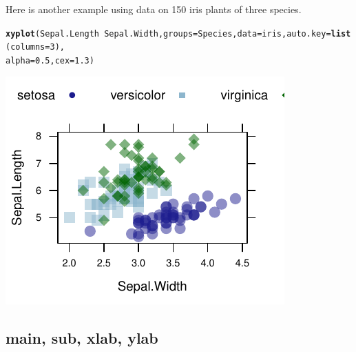 \documentclass[twoside]{book}\usepackage[]{graphicx}\usepackage[]{xcolor}
\makeatletter
\def\maxwidth{ %
  \ifdim\Gin@nat@width>\linewidth
    \linewidth
  \else
    \Gin@nat@width
  \fi
}
\newcommand{\hlnum}[1]{\textcolor[rgb]{0.686,0.059,0.569}{#1}}%
\newcommand{\hlopt}[1]{\textcolor[rgb]{0,0,0}{#1}}%
\newcommand{\hlstd}[1]{\textcolor[rgb]{0.345,0.345,0.345}{#1}}%
\newcommand{\hlkwc}[1]{\textcolor[rgb]{0.333,0.667,0.333}{#1}}%
\newcommand{\hlkwd}[1]{\textcolor[rgb]{0.737,0.353,0.396}{\textbf{#1}}}%
\newenvironment{kframe}{%
 \def\at@end@of@kframe{}%
 \ifinner\ifhmode%
  \def\at@end@of@kframe{\end{minipage}}%
  \begin{minipage}{\columnwidth}%
 \fi\fi%
 \def\FrameCommand##1{\hskip\@totalleftmargin \hskip-\fboxsep
 \colorbox{shadecolor}{##1}\hskip-\fboxsep
     \hskip-\linewidth \hskip-\@totalleftmargin \hskip\columnwidth}%
 \MakeFramed {\advance\hsize-\width
   \@totalleftmargin\z@ \linewidth\hsize
   \@setminipage}}%
 {\par\unskip\endMakeFramed%
 \at@end@of@kframe}
\newenvironment{knitrout}{}{} %
\newcounter{example}[section]
\makeatother
\begin{document}
Here is another example using data on 150 iris plants of three species.
\begin{knitrout}
\color{fgcolor}\begin{kframe}
\begin{alltt}
\hlkwd{xyplot}\hlstd{(Sepal.Length} \hlopt{~} \hlstd{Sepal.Width,} \hlkwc{groups} \hlstd{= Species,} \hlkwc{data} \hlstd{= iris,} \hlkwc{auto.key} \hlstd{=} \hlkwd{list}\hlstd{(}\hlkwc{columns} \hlstd{=} \hlnum{3}\hlstd{),}
    \hlkwc{alpha} \hlstd{=} \hlnum{0.5}\hlstd{,} \hlkwc{cex} \hlstd{=} \hlnum{1.3}\hlstd{)}
\end{alltt}
\end{kframe}

{\centering \includegraphics[width=\maxwidth]{figures/fig-iris-xyplot-alpha-1} 

}



\end{knitrout}

\subsection*{main, sub, xlab, ylab}
\end{document}
